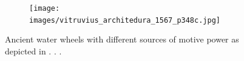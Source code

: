\documentclass[a4paper, 12pt]{article}
\begin{document}
\begin{figure}[H]
\begin{subfigure}{.45\textwidth}
        \caption{} \label{fig:vitruvius_architedura_1567_p348b}
    \end{subfigure}%
    \hspace{2em}%
    \begin{subfigure}{.45\textwidth}
        \centering
        \texttt{[image: images/vitruvius\_architedura\_1567\_p348c.jpg]}
        \caption{} \label{fig:vitruvius_architedura_1567_p348c}
    \end{subfigure}%
    \caption{Ancient water wheels with different sources of motive power as depicted in \citet[pp.~99,101]{vitruvius_architectura_1511}.  \citet[pp.~241-242]{vitruvius_architectvra_1543}. \citet[p.~348]{vitruvius_architedura_1567}. }  \label{fig:two:wheels}
\end{figure}











    
\end{document}
